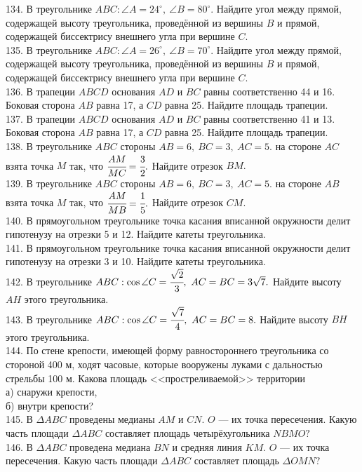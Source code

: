 134. В треугольнике $ABC: \angle A=24^\circ,\ \angle B=80^\circ.$ Найдите угол между прямой, содержащей высоту треугольника, проведённой из вершины $B$ и прямой, содержащей биссектрису внешнего угла при вершине $C.$\\
135. В треугольнике $ABC: \angle A=26^\circ,\ \angle B=70^\circ.$ Найдите угол между прямой, содержащей высоту треугольника, проведённой из вершины $B$ и прямой, содержащей биссектрису внешнего угла при вершине $C.$\\
136. В трапеции $ABCD$ основания $AD$ и $BC$ равны соответственно 44 и 16. Боковая сторона $AB$ равна 17, а $CD$ равна 25. Найдите площадь трапеции.\\
137. В трапеции $ABCD$ основания $AD$ и $BC$ равны соответственно 41 и 13. Боковая сторона $AB$ равна 17, а $CD$ равна 25. Найдите площадь трапеции.\\
138. В треугольнике $ABC$ стороны $AB=6,\ BC=3,\ AC=5.$ на стороне $AC$ взята точка $M$ так, что $\cfrac{AM}{MC}=\cfrac{3}{2}.$ Найдите отрезок $BM.$\\
139. В треугольнике $ABC$ стороны $AB=6,\ BC=3,\ AC=5.$ на стороне $AB$ взята точка $M$ так, что $\cfrac{AM}{MB}=\cfrac{1}{5}.$ Найдите отрезок $CM.$\\
140. В прямоугольном треугольнике точка касания вписанной окружности делит гипотенузу на отрезки 5 и 12. Найдите катеты треугольника.\\
141. В прямоугольном треугольнике точка касания вписанной окружности делит гипотенузу на отрезки 3 и 10. Найдите катеты треугольника.\\
142. В треугольнике $ABC: \cos \angle C=\cfrac{\sqrt{2}}{3},\ AC=BC=3\sqrt{7}.$ Найдите высоту $AH$ этого треугольника.\\
143. В треугольнике $ABC: \cos \angle C=\cfrac{\sqrt{7}}{4},\ AC=BC=8.$ Найдите высоту $BH$ этого треугольника.\\
144. По стене крепости, имеющей форму равностороннего треугольника со стороной 400 м, ходят часовые, которые вооружены луками с дальностью стрельбы 100 м. Какова площадь <<простреливаемой>> территории\\
а) снаружи крепости,\\
б) внутри крепости?\\
145. В $\Delta ABC$ проведены медианы $AM$ и $CN.$
$O$ --- их точка пересечения. Какую часть площади $\Delta ABC$ составляет площадь четырёхугольника $NBMO?$\\
146. В $\Delta ABC$ проведена медиана $BN$ и средняя линия $KM.$ $O$ --- их точка пересечения. Какую часть площади $\Delta ABC$ составляет площадь $\Delta OMN?$\\
